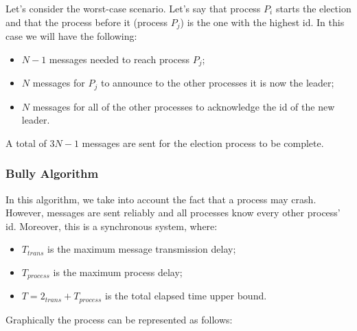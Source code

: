 \documentclass{article}
\begin{document}
Let's consider the worst-case scenario. Let's say that process $P_i$ starts the election and that the process before it (process $P_j$) is the one with the highest id. In this case we will have the following:
\begin{itemize}
	\item $N-1$ messages needed to reach process $P_j$;
	\item $N$ messages for $P_j$ to announce to the other processes it is now the leader;
	\item $N$ messages for all of the other processes to acknowledge the id of the new leader.
\end{itemize}
A total of $3N-1$ messages are sent for the election process to be complete.

\subsubsection{Bully Algorithm}
In this algorithm, we take into account the fact that a process may crash. However, messages are sent reliably and all processes know every other process' id. Moreover, this is a synchronous system, where:
\begin{itemize}
	\item $T_{trans}$ is the maximum message transmission delay;
	\item $T_{process}$ is the maximum process delay;
	\item $T = 2_{trans} + T_{process}$ is the total elapsed time upper bound.
\end{itemize}
Graphically the process can be represented as follows:
\end{document}
